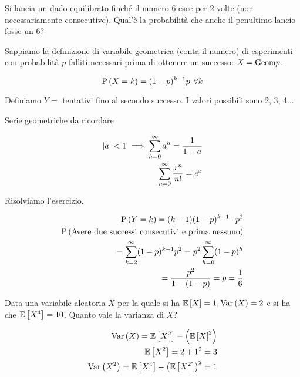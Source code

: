 \begin{exrc}
    Si lancia un dado equilibrato finch\'e il numero 6 esce per 2 volte
    (non necessariamente consecutive). Qual'\`e la probabilit\`a che anche il
    penultimo lancio fosse un 6?

    Sappiamo la definizione di variabile geometrica (conta il numero)
    di esperimenti con probabilit\`a $ p $ falliti necessari prima di ottenere un
    successo: $ X = \text{Geom}{p} $.

    \begin{equation*}
        \text{P}\left(X = k\right) = (1-p)^{k-1}p \>\> \forall k
    \end{equation*}

    Definiamo $ Y = $ tentativi fino al secondo successo. I valori possibili sono 2, 3, 4...


    \begin{note}
        Serie geometriche da ricordare

        \begin{equation*}
            \begin{aligned}
                \lvert a\rvert < 1 \implies \sum_{h=0}^{\infty} a^h = \dfrac{1}{1-a} \\
                \sum_{n=0}^\infty \dfrac{x^n}{n!} = e^x
            \end{aligned}
        \end{equation*}
    \end{note}

    Risolviamo l'esercizio.

    \begin{equation*}
        \begin{aligned}
            \text{P}\left(Y = k\right) = (k-1)(1-p)^{k-1}\cdot p^2 \\
            \text{P}\left(\text{Avere due successi consecutivi e prima nessuno}\right) \\
            = \sum_{k=2}^\infty (1-p)^{k-1}p^2 =  p^2 \sum_{h=0}^{\infty} (1-p)^h \\
            = \dfrac{p^2}{1-(1-p)} = p = \dfrac{1}{6}
        \end{aligned}
    \end{equation*}
\end{exrc}


\begin{exrc}
    Data una variabile aleatoria $ X $ per la quale si ha $ \mathbb{E}\left[X\right] = 1, \text{Var}\left(X\right) = 2$ e si ha che $ \mathbb{E}\left[X^4\right] = 10 $. Quanto vale la varianza di $ X $?

    \begin{equation*}
        \begin{aligned}
            \text{Var}\left(X\right) = \mathbb{E}\left[X^2\right] - \left( \mathbb{E}\left[X\right]^2 \right) \\
            \mathbb{E}\left[X^2\right] = 2 + 1^2 = 3 \\
            \text{Var}\left(X^2\right) = \mathbb{E}\left[X^4\right] - \left( \mathbb{E}\left[X^2\right] \right)^2 = 1
        \end{aligned}
    \end{equation*}
\end{exrc}

